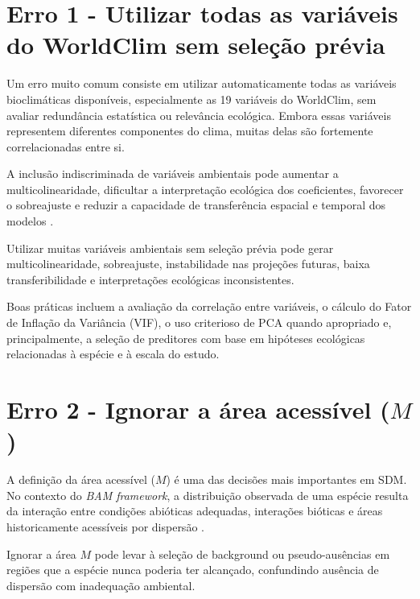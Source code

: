 \documentclass{ueap-sdm}
\begin{document}
\section{Erro 1 - Utilizar todas as variáveis do WorldClim sem seleção prévia}

Um erro muito comum consiste em utilizar automaticamente todas as variáveis
bioclimáticas disponíveis, especialmente as 19 variáveis do WorldClim, sem
avaliar redundância estatística ou relevância ecológica. Embora essas variáveis
representem diferentes componentes do clima, muitas delas são fortemente
correlacionadas entre si.

A inclusão indiscriminada de variáveis ambientais pode aumentar a
multicolinearidade, dificultar a interpretação ecológica dos coeficientes,
favorecer o sobreajuste e reduzir a capacidade de transferência espacial e
temporal dos modelos \citep{dormann2013collinearity, guisan2017habitat}.

\begin{sdmwarningbox}
	Utilizar muitas variáveis ambientais sem seleção prévia pode gerar
	multicolinearidade, sobreajuste, instabilidade nas projeções futuras,
	baixa transferibilidade e interpretações ecológicas inconsistentes.
\end{sdmwarningbox}

Boas práticas incluem a avaliação da correlação entre variáveis, o cálculo do
Fator de Inflação da Variância (VIF), o uso criterioso de PCA quando
apropriado e, principalmente, a seleção de preditores com base em hipóteses
ecológicas relacionadas à espécie e à escala do estudo.

\section{Erro 2 - Ignorar a área acessível \texorpdfstring{($M$)}{M}}

A definição da área acessível ($M$) é uma das decisões mais importantes em
SDM. No contexto do \textit{BAM framework}, a distribuição observada de uma
espécie resulta da interação entre condições abióticas adequadas, interações
bióticas e áreas historicamente acessíveis por dispersão
\citep{soberon2005interpretation, soberon2009niches, barve2011crucial}.

Ignorar a área $M$ pode levar à seleção de background ou pseudo-ausências em
regiões que a espécie nunca poderia ter alcançado, confundindo ausência de
dispersão com inadequação ambiental.
\end{document}

